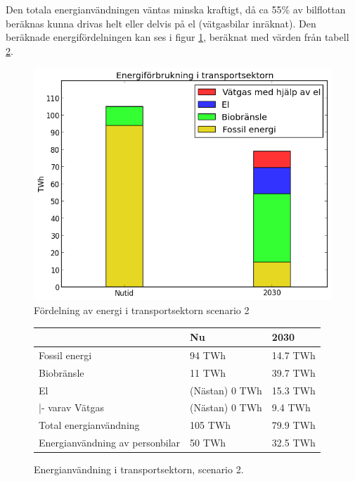 \documentclass[a4paper,11pt,fleqn, titlepage]{article}
\begin{document}
Den totala energianvändningen väntas minska kraftigt, då ca 55\% av bilflottan beräknas
kunna drivas helt eller delvis på el (vätgasbilar inräknat). Den beräknade energifördelningen
kan ses i figur \ref{fig:scen2transport}, beräknat med värden från tabell \ref{tab:scen2energi}.

\begin{figure}[h!]
       \centering
       \includegraphics[scale=0.7]{scen2transport.png}
       \caption{Fördelning av energi i transportsektorn scenario 2}
       \label{fig:scen2transport}
\end{figure}

\begin{figure}[h!]
	\centering
	\begin{tabular}{ | l | l | l | }
	\hline
						& Nu		& 2030 \\ \hline
	Fossil energi				& 94 TWh	& 14.7 TWh \\ \hline
	Biobränsle				& 11 TWh	& 39.7 TWh \\ \hline %
	El					& (Nästan) 0 TWh &  15.3 TWh \\ \hline %
	|- varav Vätgas     & (Nästan) 0 TWh & 9.4 TWh\\ \hline
	Total energianvändning		& 105 TWh	& 79.9 TWh \\ \hline
	Energianvändning av personbilar	& 50 TWh	& 32.5 TWh \\ \hline
	\end{tabular}
	\caption{Energianvändning i transportsektorn, scenario 2.}
	\label{tab:scen2energi}
\end{figure}
\end{document}

